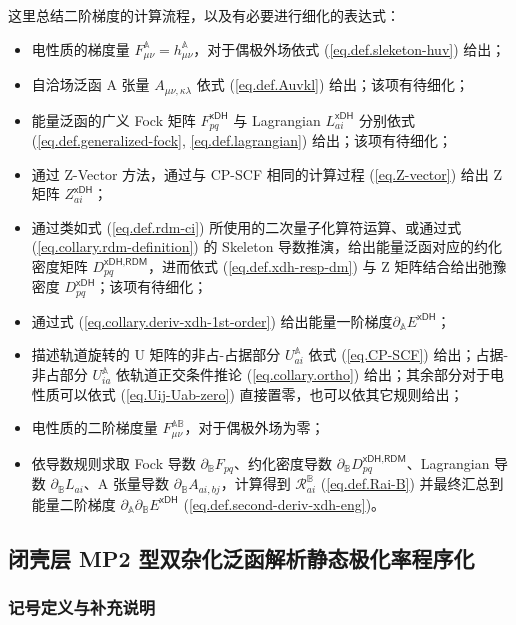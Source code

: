 这里总结二阶梯度的计算流程，以及有必要进行细化的表达式：
\begin{itemize}[nosep]
  \item 电性质的梯度量 $F_{\mu \nu}^\mathbb{A} = h_{\mu \nu}^\mathbb{A}$，对于偶极外场依式 (\ref{eq.def.sleketon-huv}) 给出；
  \item 自洽场泛函 A 张量 $A_{\mu \nu, \kappa \lambda}$ 依式 (\ref{eq.def.Auvkl}) 给出；该项有待细化；
  \item 能量泛函的广义 Fock 矩阵 $F_{pq}^\textsf{xDH}$ 与 Lagrangian $L_{ai}^\textsf{xDH}$ 分别依式 (\ref{eq.def.generalized-fock}, \ref{eq.def.lagrangian}) 给出；该项有待细化；
  \item 通过 Z-Vector 方法，通过与 CP-SCF 相同的计算过程 (\ref{eq.Z-vector}) 给出 Z 矩阵 $Z_{ai}^\textsf{xDH}$；
  \item 通过类如式 (\ref{eq.def.rdm-ci}) 所使用的二次量子化算符运算、或通过式 (\ref{eq.collary.rdm-definition}) 的 Skeleton 导数推演，给出能量泛函对应的约化密度矩阵 $D_{pq}^{\textsf{xDH}, \textsf{RDM}}$，进而依式 (\ref{eq.def.xdh-resp-dm}) 与 Z 矩阵结合给出弛豫密度 $D_{pq}^\textsf{xDH}$；该项有待细化；
  \item 通过式 (\ref{eq.collary.deriv-xdh-1st-order}) 给出能量一阶梯度$\partial_\mathbb{A} E^\textsf{xDH}$；
  \item 描述轨道旋转的 U 矩阵的非占-占据部分 $U_{ai}^\mathbb{A}$ 依式 (\ref{eq.CP-SCF}) 给出；占据-非占部分 $U_{ia}^\mathbb{A}$ 依轨道正交条件推论 (\ref{eq.collary.ortho}) 给出；其余部分对于电性质可以依式 (\ref{eq.Uij-Uab-zero}) 直接置零，也可以依其它规则给出；
  \item 电性质的二阶梯度量 $F_{\mu \nu}^\mathbb{AB}$，对于偶极外场为零；
  \item 依导数规则求取 Fock 导数 $\partial_\mathbb{B} F_{pq}$、约化密度导数 $\partial_\mathbb{B} D_{pq}^{\textsf{xDH}, \textsf{RDM}}$、Lagrangian 导数 $\partial_\mathbb{B} L_{ai}$、A 张量导数 $\partial_\mathbb{B} A_{ai, bj}$，计算得到 $\mathscr{R}_{ai}^\mathbb{B}$ (\ref{eq.def.Rai-B}) 并最终汇总到能量二阶梯度 $\partial_\mathbb{A} \partial_\mathbb{B} E^\textsf{xDH}$ (\ref{eq.def.second-deriv-xdh-eng})。
\end{itemize}

\subsection{闭壳层 MP2 型双杂化泛函解析静态极化率程序化}
\label{sec.3.program}

\subsubsection{记号定义与补充说明}

